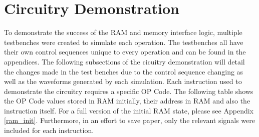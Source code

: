 \documentclass{article}
\begin{document}
    
\section{Circuitry Demonstration}
    To demonstrate the success of the RAM and memory interface logic, multiple testbenches were created to simulate each operation.  The testbenches all have their own control sequences unique to every operation and can be found in the appendices. The following subsections of the cicuitry demonstration will detail the changes made in the test benches due to the control sequence changing as well as the waveforms generated by each simulation. Each instruction used to demonstrate the circuitry requires a specific OP Code. The following table shows the OP Code values stored in RAM initially, their address in RAM and also the instruction itself. For a full version of the initial RAM state, please see Appendix \ref{ram_init}. Furthermore, in an effort to save paper, only the relevant signals were included for each instruction.
\end{document}
